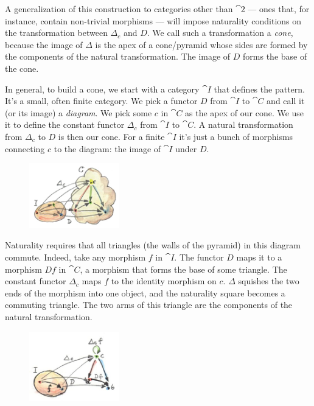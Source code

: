 \noindent
A generalization of this construction to categories other than
$\cat{2}$ --- ones that, for instance, contain non-trivial morphisms
--- will impose naturality conditions on the transformation between
$\Delta_c$ and $D$. We call such a transformation a \emph{cone},
because the image of $\Delta$ is the apex of a cone/pyramid whose sides are
formed by the components of the natural transformation. The image of $D$
forms the base of the cone.

In general, to build a cone, we start with a category $\cat{I}$ that
defines the pattern. It's a small, often finite category. We pick a
functor $D$ from $\cat{I}$ to $\cat{C}$ and call it (or its image) a
\emph{diagram}. We pick some $c$ in $\cat{C}$ as the apex of our
cone. We use it to define the constant functor $\Delta_c$ from
$\cat{I}$ to $\cat{C}$. A natural transformation from $\Delta_c$
to $D$ is then our cone. For a finite $\cat{I}$ it's just a bunch of
morphisms connecting $c$ to the diagram: the image of $\cat{I}$
under $D$.

\begin{figure}[H]
  \centering
  \includegraphics[width=0.35\textwidth]{images/cone.jpg}
\end{figure}

\noindent
Naturality requires that all triangles (the walls of the pyramid) in
this diagram commute. Indeed, take any morphism $f$ in $\cat{I}$.
The functor $D$ maps it to a morphism $D f$ in $\cat{C}$, a
morphism that forms the base of some triangle. The constant functor
$\Delta_c$ maps $f$ to the identity morphism on
$c$. $\Delta$ squishes the two ends of the morphism into one object, and
the naturality square becomes a commuting triangle. The two arms of this
triangle are the components of the natural transformation.

\begin{figure}[H]
  \centering
  \includegraphics[width=0.35\textwidth]{images/conenaturality.jpg}
\end{figure}

